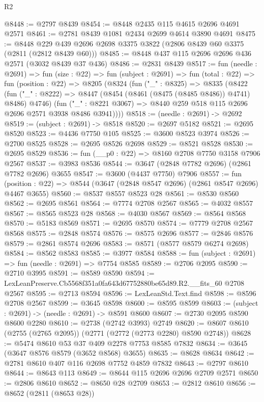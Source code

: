 \begin{lexlean}{R2}
\begin{coremodule}
@8448 := @2797 @8439
@8454 := @8448 @2435 @115 @4615 @2696 @4691 @2571
@8461 := @2781 @8439 @1081 @2434 @2699 @4614 @3890 @4691
@8475 := @8448 @229 @439 @2696 @2698 @3375 @3822 (@2806 @8439 @60 @3375 (@2811 (@2812 @8439 @60)))
@8485 := @8448 @437 @115 @2696 @2696 @436 @2571 (@3032 @8439 @37 @436)
@8486 := @2831 @8439
@8517 := fun (needle : @2691) =>
  fun (size : @22) =>
  fun (subject : @2691) =>
  fun (total : @22) =>
  fun (position : @22) =>
  @8205
    (@8324
      (fun ("_" : @8325) =>
      @8335
        (@8422
          (fun ("_" : @8222) => @8447 (@8454 (@8461 (@8475 (@8485 @8486)) @4741) @8486) @4746)
          (fun ("_" : @8221 @3067) => @8440 @259 @518 @115 @2696 @2696 @2571 @3938 @8486 @3941))))
@8518 := (needle : @2691) -> @2692
@8519 := (subject : @2691) -> @8518
@8520 := @2697 @5182
@8521 := @2695 @8520
@8523 := @4436 @7750 @105
@8525 := @3600 @8523 @3974
@8526 := @2700 @8525
@8528 := @2695 @8526 @2698
@8529 := @8521 @8528
@8530 := @2695 @8529
@8536 := fun (__p0 : @22) => @8160 @2708 @7750 @3158 @7906 @2567
@8537 := @3983 @8536
@8544 := @3647 (@2848 @7782 @2696) (@2861 @7782 @2696) @3655
@8547 := @3600 (@4437 @7750) @7906
@8557 := fun (position : @22) => @8544 (@3647 (@2848 @8547 @2696) (@2861 @8547 @2696) @4467 @3655)
@8560 := @8537 @8557 @8523 @28
@8561 := @8530 @8560
@8562 := @2695 @8561
@8564 := @7774 @2708 @2567
@8565 := @4032 @8557
@8567 := @8565 @8523 @28
@8568 := @4030 @8567
@8569 := @8564 @8568
@8570 := @5183 @8569
@8571 := @2695 @8570
@8574 := @7779 @2708 @2567 @8568
@8575 := @2848 @8574
@8576 := @8575 @2696
@8577 := @2846 @8576
@8579 := @2861 @8574 @2696
@8583 := @8571 (@8577 @8579 @6274 @2698)
@8584 := @8562 @8583
@8585 := @3977 @8584
@8588 := fun (subject : @2691) => fun (needle : @2691) => @7754 @8585
@8589 := @2706 @2095
@8590 := @2710 @3995
@8591 := @8589 @8590
@8594 := LexLeanPreserve.Cb5568f351a0fa643d67752880be65d89.R2.__fits_60 @2708 @2567
@8595 := @2713 @8594
@8596 := LexLeanStd.Text.find
@8598 := @8596 @2708 @2567
@8599 := @3645 @8598
@8600 := @8595 @8599
@8603 := (subject : @2691) -> (needle : @2691) -> @8591 @8600
@8607 := @2730 @2095 @8590 @8600 @2280
@8610 := @2738 (@2742 @3993) @2749
@8620 := @8607 @8610 (@2755 (@2765 @2095)) (@2771 (@2772 (@2773 @2280) @8590 @2748))
@8628 := @5474 @8610 @53 @37 @409 @2278 @7753 @8585 @7832
@8634 := @3645 (@3647 @8576 @8579 (@3652 @8568) @3655)
@8635 := @8628 @8634
@8642 := @2781 @8610 @407 @116 @2698 @7752 @4859 @7832
@8643 := @2797 @8610
@8644 := @8643 @113
@8649 := @8644 @115 @2696 @2696 @2709 @2571
@8650 := @2806 @8610
@8652 := @8650 @28 @2709
@8653 := @2812 @8610
@8656 := @8652 (@2811 (@8653 @28))

\end{coremodule}
\end{lexlean}
